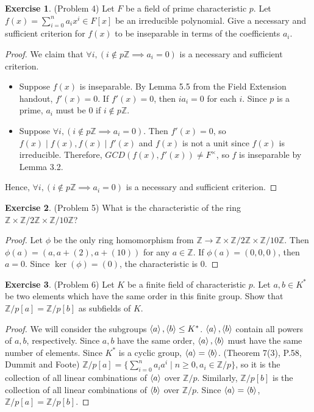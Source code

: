 \documentclass[12pt, psamsfonts]{amsart}
\theoremstyle{definition}
\newtheorem*{exer}{Exercise}
\theoremstyle{remark}
\numberwithin{equation}{section}
\begin{document}
\begin{exer}{(Problem 4)}
  Let $F$ be a field of prime characteristic $p$.
  Let $f(x) = \sum_{i=0}^n a_ix^i \in F[x]$ be an irreducible polynomial.
  Give a necessary and sufficient criterion for $f(x)$ to be inseparable in terms of the coefficients $a_i$.
\end{exer}

\begin{proof}
  We claim that $\forall i, (i \notin p\mathbb{Z} \implies a_i = 0)$ is a necessary and sufficient criterion.
  \begin{itemize}
    \item
      Suppose $f(x)$ is inseparable.
      By Lemma 5.5 from the Field Extension handout, $f'(x) = 0$.
      If $f'(x) = 0$, then $ia_i = 0$ for each $i$.
      Since $p$ is a prime, $a_i$ must be $0$ if $i \notin p\mathbb{Z}$.
    \item
      Suppose $\forall i, (i \notin p\mathbb{Z} \implies a_i = 0)$.
      Then $f'(x) = 0$, so $f(x) \mid f(x), f(x) \mid f'(x)$ and $f(x)$ is not a unit since $f(x)$ is irreducible.
      Therefore, $GCD(f(x), f'(x)) \ne F^{\times}$, so $f$ is inseparable by Lemma 3.2.
  \end{itemize}
  Hence, $\forall i, (i \notin p\mathbb{Z} \implies a_i = 0)$ is a necessary and sufficient criterion.
\end{proof}

\begin{exer}{(Problem 5)}
  What is the characteristic of the ring $\mathbb{Z} \times \mathbb{Z} / 2\mathbb{Z} \times \mathbb{Z} / 10\mathbb{Z}$?
\end{exer}

\begin{proof}
  Let $\phi$ be the only ring homomorphism from $\mathbb{Z} \rightarrow \mathbb{Z} \times \mathbb{Z} / 2\mathbb{Z} \times \mathbb{Z} / 10\mathbb{Z}$.
  Then $\phi(a) = (a, a + (2), a + (10))$ for any $a \in \mathbb{Z}$.
  If $\phi(a) = (0, 0, 0)$, then $a = 0$.
  Since $\ker(\phi) = (0)$, the characteristic is 0.
\end{proof}

\begin{exer}{(Problem 6)}
  Let $K$ be a finite field of characteristic $p$.
  Let $a, b \in K^*$ be two elements which have the same order in this finite group.
  Show that $\mathbb{Z}/p[a] = \mathbb{Z}/p[b]$ as subfields of $K$.
\end{exer}

\begin{proof}
  We will consider the subgroups $\ev{ a }, \ev{ b } \leq K^*$.
  $\ev{ a }, \ev{ b }$ contain all powers of $a, b$, respectively.
  Since $a, b$ have the same order, $\ev{ a }, \ev{ b }$ must have the same number of elements.
  Since $K^*$ is a cyclic group, $\ev{ a } = \ev{ b }$.
  (Theorem 7(3), P.58, Dummit and Foote)
  $\mathbb{Z}/p[a] = \{ \sum_{i=0}^{n} a_ia^i \mid n \geq 0, a_i \in \mathbb{Z}/p \}$, so it is the collection of all linear combinations of $\ev{ a }$ over $\mathbb{Z}/p$.
  Similarly, $\mathbb{Z}/p[b]$ is the collection of all linear combinations of $\ev{ b }$ over $\mathbb{Z}/p$.
  Since $\ev{ a } = \ev{ b }$, $\mathbb{Z}/p[a] = \mathbb{Z}/p[b]$.
\end{proof}
\end{document}
